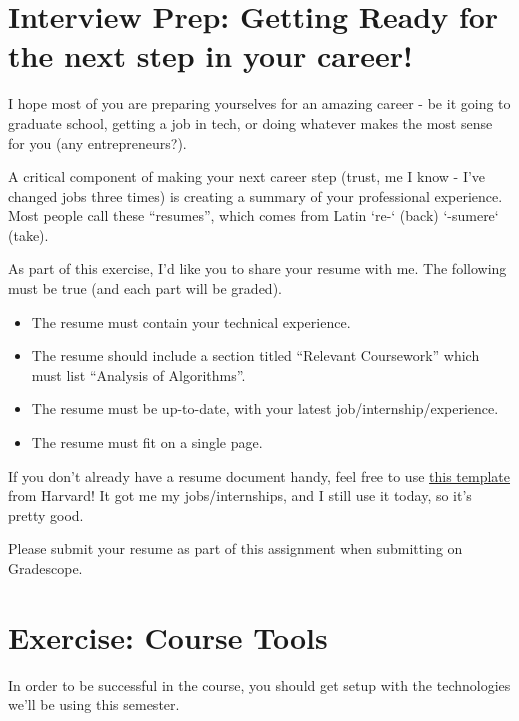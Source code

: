 \documentclass [12pt]{article}
\begin{document}

\pagebreak
\section{Interview Prep: Getting Ready for the next step in your career!}
 I hope most of you are preparing yourselves for an amazing career - be it going to graduate school, getting a job in tech, or doing whatever makes the most sense for you (any entrepreneurs?).

A critical component of making your next career step (trust, me I know - I've changed jobs three times) is creating a summary of your professional experience. Most people call these ``resumes'', which comes from Latin `re-` (back) `-sumere` (take).

As part of this exercise, I'd like you to share your resume with me. The following must be true (and each part will be graded).

\begin{itemize}
    \item {} The resume must contain your technical experience.
    \item {} The resume should include a section titled ``Relevant Coursework'' which must list ``Analysis of Algorithms''. 
    \item {} The resume must be up-to-date, with your latest job/internship/experience.
    \item {} The resume must fit on a single page. 
\end{itemize}

If you don't already have a resume document handy, feel free to use \href{http://hwpi.harvard.edu/files/ocs/files/template_bullet.doc}{this template} from Harvard! It got me my jobs/internships, and I still use it today, so it's pretty good.

Please submit your resume as part of this assignment when submitting on Gradescope.


\section{Exercise: Course Tools}
 In order to be successful in the course, you should get setup with the technologies we'll be using this semester. 
\end{document}
